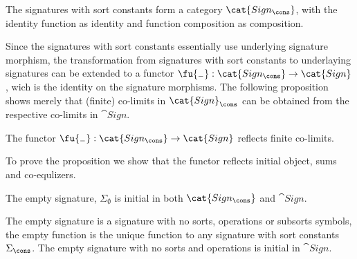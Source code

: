 \begin{fact}
The signatures with sort constants form a category $\cat{Sign_\cons}$, with
the identity function as identity and function composition as composition.
\end{fact}
%
Since the signatures with sort constants essentially use underlying signature
morphism, the transformation from signatures with sort constants to
underlaying signatures can be extended to a functor $\fu{_-}:\cat{Sign_\cons} \to
\cat{Sign}$, wich is the identity on the signature morphisms. The following
proposition shows merely that (finite) co-limits in $\cat{Sign}_\cons$
can be obtained from the respective co-limits in $\cat{Sign}$. 

\begin{proposition}\label{prop:finco}
The functor $\fu{_-}:\cat{Sign_\cons} \to \cat{Sign}$ reflects finite co-limits.
\end{proposition}
%
To prove the proposition we show that the functor reflects initial object, sums and co-equlizers.

\begin{lemma}
The empty signature, $\Sigma_\emptyset$ is initial in both $\cat{Sign_\cons}$ and $\cat{Sign}$.
\end{lemma}
%
\begin{PROOF}
The empty signature is a signature with no sorts, operations or subsorts
symbols, the empty function is the unique function to any signature with sort
constants $\Sigma_\cons$. The empty signature with no sorts and operations is
initial in $\cat{Sign}$.
\end{PROOF}

